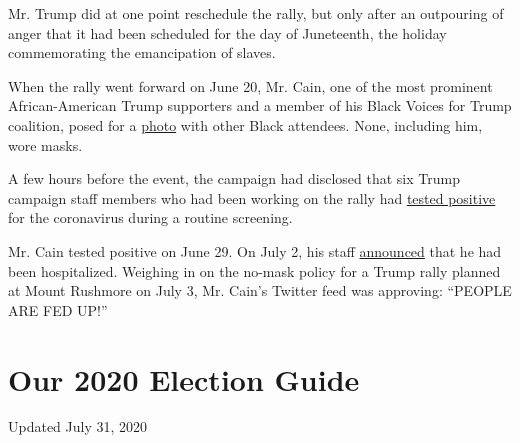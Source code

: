 Mr. Trump did at one point reschedule the rally, but only after an
outpouring of anger that it had been scheduled for the day of
Juneteenth, the holiday commemorating the emancipation of slaves.

When the rally went forward on June 20, Mr. Cain, one of the most
prominent African-American Trump supporters and a member of his Black
Voices for Trump coalition, posed for a
\href{https://pbs.twimg.com/media/Ea_lixbWAAAdPOP.jpg}{photo} with other
Black attendees. None, including him, wore masks.

A few hours before the event, the campaign had disclosed that six Trump
campaign staff members who had been working on the rally had
\href{https://www.nytimes.com/2020/06/20/us/trump-rally-tulsa.html?action=click\&module=Top\%20Stories\&pgtype=Homepage}{tested
positive} for the coronavirus during a routine screening.

Mr. Cain tested positive on June 29. On July 2, his staff
\href{https://twitter.com/THEHermanCain/status/1278735184893009921?s=20}{announced}
that he had been hospitalized. Weighing in on the no-mask policy for a
Trump rally planned at Mount Rushmore on July 3, Mr. Cain's Twitter feed
was approving: ``PEOPLE ARE FED UP!''

\hypertarget{our-2020-election-guide}{%
\section{Our 2020 Election Guide}\label{our-2020-election-guide}}

Updated July 31, 2020


